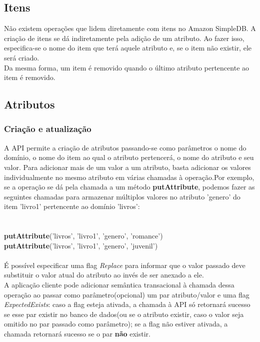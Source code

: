 \subsection{Itens}
Não existem operações que lidem diretamente com itens no Amazon SimpleDB. A criação de itens se dá indiretamente pela adição de um atributo. Ao fazer isso, especifica-se o nome do item que terá aquele atributo e, se o item não existir, ele será criado. \\
Da mesma forma, um item é removido quando o último atributo pertencente ao item é removido.

\subsection{Atributos}
\subsubsection{Criação e atualização}
A API permite a criação de atributos passando-se como parâmetros o nome do domínio, o nome do item ao qual o atributo pertencerá, o nome do atributo e seu valor. Para adicionar mais de um valor a um atributo, basta adicionar os valores individualmente no mesmo atributo em várias chamadas à operação.Por exemplo, se a operação se dá pela chamada a um método \textbf{putAttribute}, podemos fazer as seguintes chamadas para armazenar múltiplos valores no atributo 'genero' do item 'livro1' pertencente ao domínio 'livros':\\
\\\\
\textbf{putAttribute}('livros', 'livro1', 'genero', 'romance')\\
\textbf{putAttribute}('livros', 'livro1', 'genero', 'juvenil')
\\\\
É possível especificar uma flag \textit{Replace} para informar que o valor passado deve substituir o valor atual do atributo ao invés de ser anexado a ele.\\
A aplicação cliente pode adicionar semântica transacional à chamada dessa operação ao passar como parâmetro(opcional) um par atributo/valor e uma flag \textit{ExpectedExists}: caso a flag esteja ativada, a chamada à API só retornará sucesso se esse par existir no banco de dados(ou se o atributo existir, caso o valor seja omitido no par passado como parâmetro); se a flag não estiver ativada, a chamada retornará sucesso se o par \textbf{não} existir.

